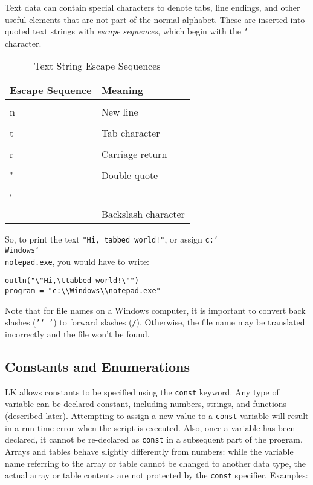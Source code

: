 \documentclass{article}
\newcommand\bslash{\char`\\}
\begin{document}
Text data can contain special characters to denote tabs, line endings, and other useful elements that are not part of the normal alphabet.  These are inserted into quoted text strings with \emph{escape sequences}, which begin with the \texttt{\bslash} character.

\begin{table}[ht]
\begin{center}
\begin{tabular}{ll}
Escape Sequence & Meaning\\
\hline
\texttt{\bslash n} & New line\\
\texttt{\bslash t} & Tab character\\
\texttt{\bslash r} & Carriage return\\
\texttt{\bslash "} & Double quote\\
\texttt{\bslash\bslash} & Backslash character\\
\end{tabular}
\caption{Text String Escape Sequences}
\label{tab_escseq}
\end{center}
\end{table}

So, to print the text \texttt{"Hi,   tabbed world!"}, or assign \texttt{c:\bslash Windows\bslash notepad.exe}, you would have to write:

\begin{verbatim}
outln("\"Hi,\ttabbed world!\"")
program = "c:\\Windows\\notepad.exe"
\end{verbatim}

Note that for file names on a Windows computer, it is important to convert back slashes (\texttt{'\bslash'}) to forward slashes (\texttt{/}).  Otherwise, the file name may be translated incorrectly and the file won't be found.

\subsection{Constants and Enumerations}

LK allows constants to be specified using the \texttt{const} keyword.  Any type of variable can be declared constant, including numbers, strings, and functions (described later).  Attempting to assign a new value to a \texttt{const} variable will result in a run-time error when the script is executed.  Also, once a variable has been declared, it cannot be re-declared as \texttt{const} in a subsequent part of the program.  Arrays and tables behave slightly differently from numbers:  while the variable name referring to the array or table cannot be changed to another data type, the actual array or table contents are not protected by the \texttt{const} specifier.  Examples:
\end{document}
